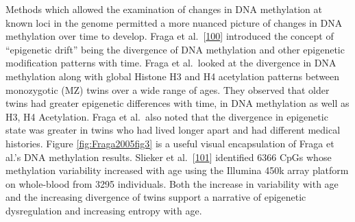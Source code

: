 \documentclass[
]{book}
\begin{document}
Methods which allowed the examination of changes in DNA methylation at known loci in the genome permitted a more nuanced picture of changes in DNA methylation over time to develop.
Fraga et al.~{[}\protect\hyperlink{ref-Fraga2005}{100}{]} introduced the concept of ``epigenetic drift'' being the divergence of DNA methylation and other epigenetic modification patterns with time.
Fraga et al.~looked at the divergence in DNA methylation along with global Histone H3 and H4 acetylation patterns between monozygotic (MZ) twins over a wide range of ages.
They observed that older twins had greater epigenetic differences with time, in DNA methylation as well as H3, H4 Acetylation.
Fraga et al.~also noted that the divergence in epigenetic state was greater in twins who had lived longer apart and had different medical histories.
Figure \ref{fig:Fraga2005fig3} is a useful visual encapsulation of Fraga et al.'s DNA methylation results.
Slieker et al.~{[}\protect\hyperlink{ref-Slieker2016}{101}{]} identified 6366 CpGs whose methylation variability increased with age using the Illumina 450k array platform on whole-blood from 3295 individuals.
Both the increase in variability with age and the increasing divergence of twins support a narrative of epigenetic dysregulation and increasing entropy with age.
\end{document}
